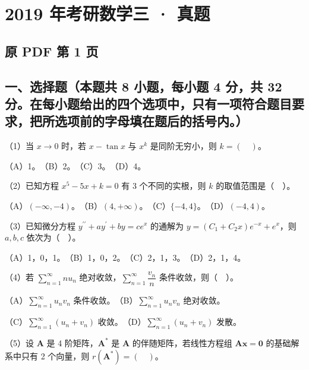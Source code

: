 \documentclass[UTF8,12pt]{ctexart}
\begin{document}
\section*{2019 年考研数学三 · 真题}
\subsection*{原 PDF 第 1 页}

\subsection*{一、选择题（本题共 8 小题，每小题 4 分，共 32 分。在每小题给出的四个选项中，只有一项符合题目要求，把所选项前的字母填在题后的括号内。）}

（1）当 \(\displaystyle x\to0\) 时，若 \(\displaystyle x-\tan x\) 与 \(\displaystyle x^k\) 是同阶无穷小，则 \(\displaystyle k=(\quad)\)。


（A）1。　（B）2。　（C）3。　（D）4。


（2）已知方程 \(\displaystyle x^5-5x+k=0\) 有 3 个不同的实根，则 \(\displaystyle k\) 的取值范围是（　）。


（A）\(\displaystyle (-\infty,\allowbreak -4)\)。　（B）\(\displaystyle (4,\allowbreak +\infty)\)。　（C）\(\displaystyle \{-4,\allowbreak 4\}\)。　（D）\(\displaystyle (-4,\allowbreak 4)\)。


（3）已知微分方程 \(\displaystyle y^{\prime\prime}+ay^\prime+by=ce^x\) 的通解为 \(\displaystyle y=(C_1+C_2x)e^{-x}+e^x\)，则 \(\displaystyle a,\allowbreak b,\allowbreak c\) 依次为（　）。


（A）1，0，1。　（B）1，0，2。　（C）2，1，3。　（D）2，1，4。


（4）若 \(\displaystyle \sum_{n=1}^{\infty}nu_n\) 绝对收敛，\(\displaystyle \sum_{n=1}^{\infty}\dfrac{\displaystyle v_n}{\displaystyle n}\) 条件收敛，则（　）。


（A）\(\displaystyle \sum_{n=1}^{\infty}u_nv_n\) 条件收敛。　（B）\(\displaystyle \sum_{n=1}^{\infty}u_nv_n\) 绝对收敛。


（C）\(\displaystyle \sum_{n=1}^{\infty}(u_n+v_n)\) 收敛。　（D）\(\displaystyle \sum_{n=1}^{\infty}(u_n+v_n)\) 发散。


（5）设 \(\displaystyle \boldsymbol A\) 是 4 阶矩阵，\(\displaystyle \boldsymbol A^*\) 是 \(\displaystyle \boldsymbol A\) 的伴随矩阵，若线性方程组 \(\displaystyle \boldsymbol A\boldsymbol x=\boldsymbol0\) 的基础解系中只有 2 个向量，则 \(\displaystyle r(\boldsymbol A^*)=(\quad)\)。
\end{document}
